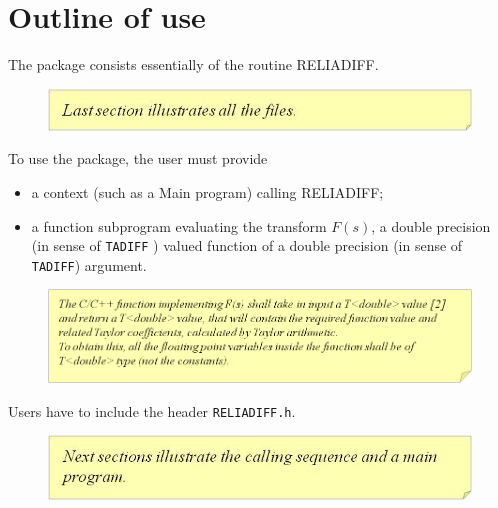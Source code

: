 \documentclass[10pt]{article}
\begin{document}
\section{Outline of use}

The package consists essentially of the routine RELIADIFF. \\

\begin{figure}[!h]
\begin{flushright}
\includegraphics[scale=0.8]{rel1}
\end{flushright}
\end{figure}

To use the package, the user must provide
\begin{itemize}
\item a  context (such as a Main program) calling RELIADIFF;
\item a  function subprogram evaluating the transform $F(s)$, a double precision (in sense of {\tt TADIFF} \cite{2}) valued function  of  a double precision (in sense of {\tt TADIFF}) argument.
\end{itemize}

\begin{figure}[!h]
\begin{flushright}
\includegraphics[scale=0.8]{rel2}
\end{flushright}
\end{figure}

Users have to include the header {\tt RELIADIFF.h}.\\

\begin{figure}[!h]
\begin{flushright}
\includegraphics[scale=0.8]{rel3}
\end{flushright}
\end{figure}
\end{document}
